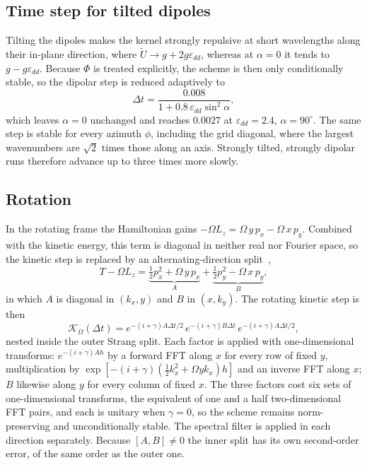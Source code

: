 \documentclass[11pt,a4paper]{article}
\begin{document}
\subsection{Time step for tilted dipoles}
\label{sec:tilt}

Tilting the dipoles makes the kernel strongly repulsive at short wavelengths along their in-plane direction, where $\tilde U\to g+2g\varepsilon_{dd}$, whereas at $\alpha=0$ it tends to $g-g\varepsilon_{dd}$. Because $\Phi$ is treated explicitly, the scheme is then only conditionally stable, so the dipolar step is reduced adaptively to
\begin{equation}
\Delta t=\frac{0.008}{1+0.8\,\varepsilon_{dd}\sin^2\alpha},
\end{equation}
which leaves $\alpha=0$ unchanged and reaches $0.0027$ at $\varepsilon_{dd}=2.4$, $\alpha=90^\circ$. The same step is stable for every azimuth $\phi$, including the grid diagonal, where the largest wavenumbers are $\sqrt2$ times those along an axis. Strongly tilted, strongly dipolar runs therefore advance up to three times more slowly.

\subsection{Rotation}

In the rotating frame the Hamiltonian gains $-\Omega L_z=\Omega\,y\,p_x-\Omega\,x\,p_y$. Combined with the kinetic energy, this term is diagonal in neither real nor Fourier space, so the kinetic step is replaced by an alternating-direction split~\cite{baoduzhang},
\begin{equation}
T-\Omega L_z = \underbrace{\tfrac12p_x^2+\Omega\,y\,p_x}_{A} + \underbrace{\tfrac12p_y^2-\Omega\,x\,p_y}_{B},
\end{equation}
in which $A$ is diagonal in $(k_x,y)$ and $B$ in $(x,k_y)$. The rotating kinetic step is then
\begin{equation}
\mathcal K_\Omega(\Delta t)=e^{-(i+\gamma)A\Delta t/2}\,e^{-(i+\gamma)B\Delta t}\,e^{-(i+\gamma)A\Delta t/2},
\end{equation}
nested inside the outer Strang split. Each factor is applied with one-dimensional transforms: $e^{-(i+\gamma)Ah}$ by a forward FFT along $x$ for every row of fixed $y$, multiplication by $\exp[-(i+\gamma)(\tfrac12k_x^2+\Omega yk_x)h]$ and an inverse FFT along $x$; $B$ likewise along $y$ for every column of fixed $x$. The three factors cost six sets of one-dimensional transforms, the equivalent of one and a half two-dimensional FFT pairs, and each is unitary when $\gamma=0$, so the scheme remains norm-preserving and unconditionally stable. The spectral filter is applied in each direction separately. Because $[A,B]\neq0$ the inner split has its own second-order error, of the same order as the outer one.
\end{document}

